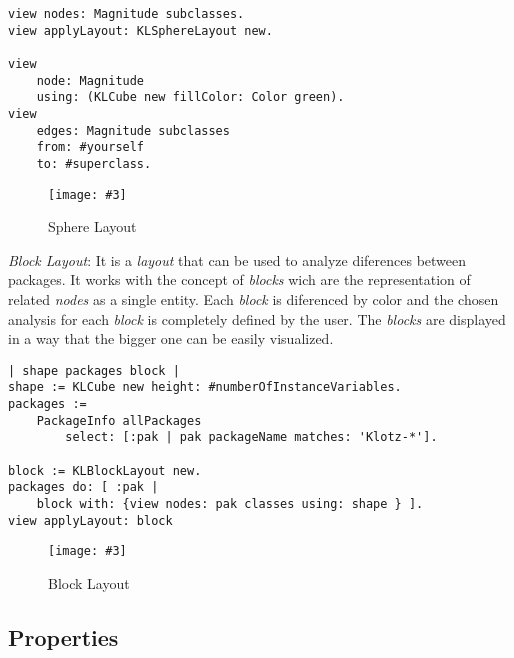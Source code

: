 \documentclass{sig-alternate}
\newcommand{\fig}[4]{
	\begin{figure}[#1]
		\centering
		\texttt{[image: \#3]}
		\caption{\label{fig:#3}#4}
	\end{figure}}
\newcommand{\seclabel}[1]{\label{sec:#1}}
\begin{document}
\begin{lstlisting}
view nodes: Magnitude subclasses. 
view applyLayout: KLSphereLayout new. 

view 
	node: Magnitude 
	using: (KLCube new fillColor: Color green). 
view 
	edges: Magnitude subclasses 
	from: #yourself 
	to: #superclass.
\end{lstlisting}
\fig{}{0.4}{sphereLayout}{Sphere Layout}

\emph{Block Layout}: It is a \emph{layout} that can be used to 
analyze diferences between packages. It works with the concept
of \emph{blocks} wich are the representation of related \emph{nodes}
as a single entity. Each \emph{block} is diferenced by color and the
chosen analysis for each \emph{block} is completely defined by the
user. The \emph{blocks} are displayed in a way that the bigger one
can be easily visualized.

\begin{lstlisting}
| shape packages block |
shape := KLCube new height: #numberOfInstanceVariables.
packages := 
	PackageInfo allPackages 
		select: [:pak | pak packageName matches: 'Klotz-*'].

block := KLBlockLayout new.
packages do: [ :pak | 
	block with: {view nodes: pak classes using: shape } ].
view applyLayout: block
	\end{lstlisting}
\fig{}{0.4}{figure9.png}{Block Layout}

\subsection{Properties} \seclabel{properties}
\end{document}
